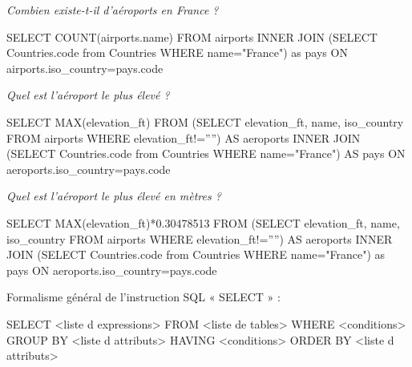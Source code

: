 \documentclass[10pt,fleqn]{article} %
\begin{document}
\begin{exemple}
\textit{Combien existe-t-il d'aéroports en France ?}

\begin{envsql}
\begin{sql}
SELECT COUNT(airports.name) 
        FROM airports 
    INNER JOIN 
        (SELECT Countries.code from Countries WHERE name="France") as pays 
    ON airports.iso_country=pays.code
\end{sql}
\end{envsql}

\textit{Quel est l'aéroport le plus élevé ?}
\begin{envsql}
\begin{sql}
SELECT MAX(elevation_ft) FROM 
    (SELECT elevation_ft, name, iso_country FROM airports WHERE elevation_ft!='''') AS aeroports
    INNER JOIN 
    (SELECT Countries.code from Countries WHERE name="France") AS pays     
        ON aeroports.iso_country=pays.code
\end{sql}
\end{envsql}

\textit{Quel est l'aéroport le plus élevé en mètres ?}
\begin{envsql}
\begin{sql}
SELECT MAX(elevation_ft)*0.30478513 FROM 
    (SELECT elevation_ft, name, iso_country FROM airports WHERE elevation_ft!='''') AS aeroports 
    INNER JOIN 
    (SELECT Countries.code from Countries WHERE name="France") as pays 
        ON aeroports.iso_country=pays.code
\end{sql}
\end{envsql}

\end{exemple}
\newpage


\begin{rem}
Formalisme général de l’instruction SQL « SELECT » :
\begin{envsql}
\begin{sql}
SELECT <liste d expressions> 
    FROM <liste de tables> 
    WHERE <conditions> 
    GROUP BY <liste d attributs> 
    HAVING <conditions> 
    ORDER BY <liste d attributs> 
\end{sql}
\end{envsql}
\end{rem}

\begin{thebibliography}{2}
\end{thebibliography}
\end{document}
